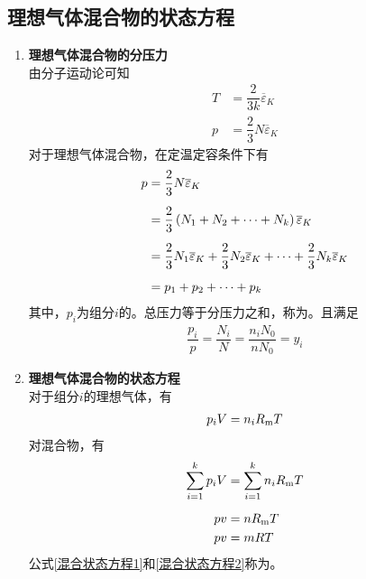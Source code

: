 \subsection{理想气体混合物的状态方程}
\begin{enumerate}[1.]
	\item \textbf{理想气体混合物的分压力}\\
	\hspace*{2em}由分子运动论可知
	\begin{align*}
		T &= \dfrac{2}{3k} \overline{\varepsilon}_K \\[0.5em]
		p &= \dfrac{2}{3} N \overline{\varepsilon}_K
	\end{align*}
	对于理想气体混合物，在定温定容条件下有
	\begin{align}
		p &= \dfrac{2}{3} N \overline{\varepsilon}_K \notag \\[0.5em]
		& = \dfrac{2}{3} \left(N_1 + N_2  + \cdots + N_k\right) \overline{\varepsilon}_K \notag \\[0.5em]
		& = \dfrac{2}{3}N_1 \overline{\varepsilon}_K  +\dfrac{2}{3}N_2 \overline{\varepsilon}_K  +\cdots + \dfrac{2}{3}N_k \overline{\varepsilon}_K \notag \\[0.5em]
		& = p_1 + p_2 + \cdots + p_k
	\end{align}
	其中，$p_i$为组分$i$的。总压力等于分压力之和，称为。且满足
	\begin{align}
		\dfrac{p_i}{p} = \dfrac{N_i}{N} = \dfrac{n_i N_0}{n N_0} = y_i
	\end{align}

	\item \textbf{理想气体混合物的状态方程}\\
	\hspace*{2em} 对于组分$i$的理想气体，有
	\begin{align}
		p_iV= n_i R_{\text{m}} T
	\end{align}
	对混合物，有
	\begin{align}
		\sum_{i = 1}^k p_iV &= \sum_{i = 1}^k n_i R_{\text{m}} T \notag\\[0.5em]
		pv &= n R_{\text{m}} T\label{混合状态方程1}\\
		pv &= mRT
		\label{混合状态方程2}
	\end{align}
	公式\eqref{混合状态方程1}和\eqref{混合状态方程2}称为。
	

\end{enumerate}
